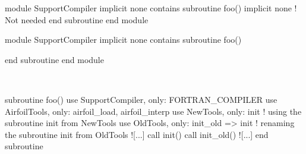 \documentclass{article}
\begin{document}
\begin{codea}
module SupportCompiler
  implicit none
contains
  subroutine foo()
    implicit none ! Not needed
  end subroutine
end module 
\end{codea}
\begin{codeb}
module SupportCompiler
  implicit none
contains
  subroutine foo()

  end subroutine
end module 
\end{codeb}\\

\begin{codefull}
subroutine foo()
  use SupportCompiler, only: FORTRAN_COMPILER
  use AirfoilTools, only: airfoil_load, airfoil_interp
  use NewTools, only: init             ! using    the subroutine init from NewTools
  use OldTools, only: init_old => init ! renaming the subroutine init from OldTools
  ![...]
  call init()
  call init_old()
  ![...]
end subroutine 
\end{codefull}




\end{document}
